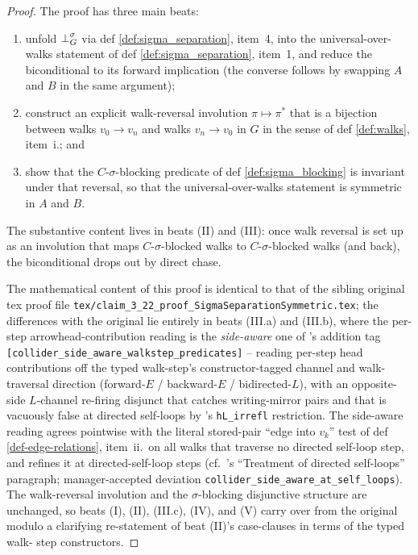\documentclass[main]{subfiles}
\begin{document}
\begin{proof}
The proof has three main beats:
\begin{enumerate}
    \item[(I)] unfold $\operatorname{\perp}^{\sigma}_G$ via def \ref{def:sigma_separation}, item~4, into the universal-over-walks statement of def \ref{def:sigma_separation}, item~1, and reduce the biconditional to its forward implication (the converse follows by swapping $A$ and $B$ in the same argument);
    \item[(II)] construct an explicit walk-reversal involution $\pi \mapsto \pi^*$ that is a bijection between walks $v_0 \to v_n$ and walks $v_n \to v_0$ in $G$ in the sense of def \ref{def:walks}, item~i.; and
    \item[(III)] show that the $C$-$\sigma$-blocking predicate of def \ref{def:sigma_blocking} is invariant under that reversal, so that the universal-over-walks statement is symmetric in $A$ and $B$.
\end{enumerate}
The substantive content lives in beats (II) and (III): once walk reversal is set up as an involution that maps $C$-$\sigma$-blocked walks to $C$-$\sigma$-blocked walks (and back), the biconditional drops out by direct chase.

The mathematical content of this proof is identical to that of the sibling original tex proof file
\texttt{tex/claim\_3\_22\_proof\_SigmaSeparationSymmetric.tex}; the differences with the original
lie entirely in beats (III.a) and (III.b), where the per-step arrowhead-contribution reading is the
\emph{side-aware} one of 's addition tag
\texttt{[collider\_side\_aware\_walkstep\_predicates]} -- reading per-step head contributions off
the typed walk-step's constructor-tagged channel and walk-traversal direction (forward-$E$ /
backward-$E$ / bidirected-$L$), with an opposite-side $L$-channel re-firing disjunct that catches
writing-mirror pairs and that is vacuously false at directed self-loops by 's
\texttt{hL\_irrefl} restriction.  The side-aware reading agrees pointwise with the literal
stored-pair ``edge into $v_k$'' test of def \ref{def-edge-relations}, item~ii.\ on all walks that
traverse no directed self-loop step, and refines it at directed-self-loop steps (cf.\ 's
``Treatment of directed self-loops'' paragraph; manager-accepted deviation
\texttt{collider\_side\_aware\_at\_self\_loops}).  The walk-reversal involution and the $\sigma$-blocking
disjunctive structure are unchanged, so beats (I), (II), (III.c), (IV), and (V) carry over from the
original modulo a clarifying re-statement of beat (II)'s case-clauses in terms of the typed walk-
step constructors.


\end{proof}
\end{document}
